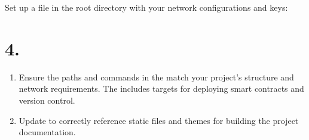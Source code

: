 \documentclass[a4paper,10pt,english]{sphinxmanual}
\begin{document}
\begin{enumerate}
\sphinxAtStartPar
Set up a  file in the root directory with your network configurations and keys:

\begin{sphinxVerbatim}[commandchars=\\\{\}]
\end{sphinxVerbatim}

\end{enumerate}


\section{4. }
\label{\detokenize{quickstart:project-configuration}}\label{\detokenize{quickstart:configuration}}\begin{enumerate}
%
\item {} 
\sphinxAtStartPar
{}

\sphinxAtStartPar
Ensure the paths and commands in the  match your project’s structure and network requirements. The  includes targets for deploying smart contracts and version control.

\item {} 
\sphinxAtStartPar
{}

\sphinxAtStartPar
Update  to correctly reference static files and themes for building the project documentation.

\end{enumerate}
\end{document}
